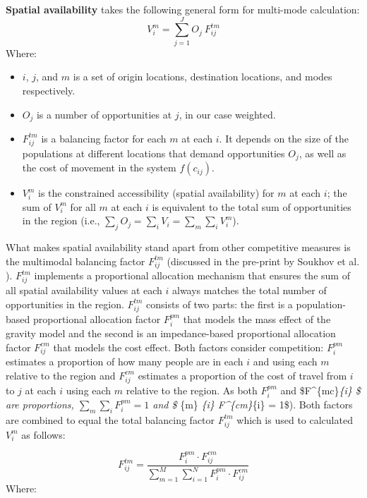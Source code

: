 \documentclass[
  super,
  preprint,
  3p]{elsarticle}
\providecommand{\tightlist}{%
  \setlength{\itemsep}{0pt}\setlength{\parskip}{0pt}}\usepackage{longtable,booktabs,array}
\begin{document}
\textbf{Spatial availability} takes the following general form for
multi-mode calculation: \[
V^m_{i} = \sum_{j=1}^J O_j\ F^{tm}_{ij}
\] \noindent Where:

\begin{itemize}
\tightlist
\item
  \(i\), \(j\), and \(m\) is a set of origin locations, destination
  locations, and modes respectively.
\item
  \(O_j\) is a number of opportunities at \(j\), in our case weighted.
\item
  \(F^{tm}_{ij}\) is a balancing factor for each \(m\) at each \(i\). It
  depends on the size of the populations at different locations that
  demand opportunities \(O_j\), as well as the cost of movement in the
  system \(f(c_{ij})\).
\item
  \(V^m_{i}\) is the constrained accessibility (spatial availability)
  for \(m\) at each \(i\); the sum of \(V^m_{i}\) for all \(m\) at each
  \(i\) is equivalent to the total sum of opportunities in the region
  (i.e., \(\sum_j O_j = \sum_i V_i = \sum_{m} \sum_{i} V^m_{i}\)).
\end{itemize}

What makes spatial availability stand apart from other competitive
measures is the multimodal balancing factor \(F^{tm}_{ij}\) (discussed
in the pre-print by Soukhov et al.
\citep{soukhovMultimodalSpatialAvailability2023}). \(F^{tm}_{ij}\)
implements a proportional allocation mechanism that ensures the sum of
all spatial availability values at each \(i\) always matches the total
number of opportunities in the region. \(F^{tm}_{ij}\) consists of two
parts: the first is a population-based proportional allocation factor
\(F_i^{pm}\) that models the mass effect of the gravity model and the
second is an impedance-based proportional allocation factor
\(F_{ij}^{cm}\) that models the cost effect. Both factors consider
competition: \(F^{pm}_{i}\) estimates a proportion of how many people
are in each \(i\) and using each \(m\) relative to the region and
\(F^{cm}_{ij}\) estimates a proportion of the cost of travel from \(i\)
to \(j\) at each \(i\) using each \(m\) relative to the region. As both
\(F^{pm}_{i}\) and \$F\^{}\{mc\}\emph{\{i\} \$ are proportions,
\(\sum_{m} \sum_{i} F^{pm}_{i} = 1\) and \$ \sum}\{m\} \sum\emph{\{i\}
F\^{}\{cm\}}\{i\} = 1\$). Both factors are combined to equal the total
balancing factor \(F^{tm}_{ij}\) which is used to calculated \(V^m_i\)
as follows:

\[
F^{tm}_{ij} = \frac{F^{pm}_{i} \cdot F^{cm}_{ij}}{\sum_{m=1}^M \sum_{i=1}^N F^{pm}_{i} \cdot F^{cm}_{ij}}
\] \noindent Where:
\end{document}
